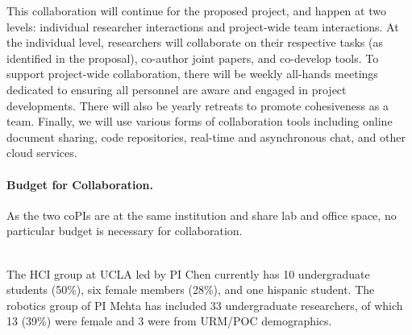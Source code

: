 This collaboration will continue for the proposed project, and happen at two levels: individual researcher interactions and project-wide team interactions. At the individual level, researchers will collaborate on their respective tasks (as identified in the proposal), co-author joint papers, and co-develop tools.  To support project-wide collaboration, there will be weekly all-hands meetings dedicated to ensuring all personnel are aware and engaged in project developments.  There will also be yearly retreats to promote cohesiveness as a team.  Finally, we will use various forms of collaboration tools including online document sharing, code repositories, real-time and asynchronous chat, and other cloud services.



\paragraph{Budget for Collaboration.}

As the two coPIs are at the same institution and share lab and office space, no particular budget is necessary for collaboration.  

\newpage


\\



The HCI group at UCLA led by PI Chen currently has 10 undergraduate students (50\%), six female members (28\%), and one hispanic student.  The robotics group of PI Mehta has included 33 undergraduate researchers, of which 13 (39\%) were female and 3 were from URM/POC demographics.

